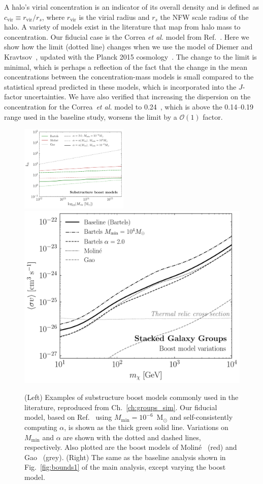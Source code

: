 A halo's virial concentration is an indicator of its overall density and is defined as $c_\text{vir} \equiv r_\text{vir}/r_s$, where $r_\text{vir}$ is the virial radius and $r_s$ the NFW scale radius of the halo.  A variety of models exist in the literature that map from halo mass to concentration.  Our fiducial case is the Correa \emph{et al.} model from Ref.~\cite{Correa:2015dva}.  Here we show how the limit (dotted line) changes when we use the model of Diemer and Kravtsov~\cite{Diemer:2014gba}, updated with the Planck 2015 cosmology~\cite{Ade:2015xua}.  The change to the limit is minimal, which is perhaps a reflection of the fact that the change in the mean concentrations between the concentration-mass models is small compared to the statistical spread predicted in these models, which is incorporated into the $J$-factor uncertainties.  We have also verified that increasing the dispersion on the concentration for the Correa~\emph{et al.} model to 0.24~\cite{Bullock:1999he}, which is above the 0.14--0.19 range used in the baseline study, worsens the limit by a $\mathcal{O}(1)$ factor.\vspace{0.1in}

\begin{figure}[t]
  \centering
  \includegraphics[width=0.46\textwidth]{ch-clusters/plots/boost_models_data.pdf} 
     \includegraphics[width=.45\textwidth]{ch-clusters/plots/systematics_boost.pdf}
  \caption{(Left) Examples of substructure boost models commonly used in the literature, reproduced from Ch.~\ref{ch:groups_sim}. Our fiducial model, based on Ref.~\cite{Bartels:2015uba} using $M_\text{min} = 10^{-6}$~M$_\odot$ and self-consistently computing $\alpha$, is shown as the thick green solid line. Variations on $M_\text{min}$ and $\alpha$ are shown with the dotted and dashed lines, respectively. Also plotted are the boost models of Molin\'e~\cite{Moline:2016pbm} (red) and Gao~\cite{Gao:2011rf} (grey).  (Right) The same as the baseline analysis shown in Fig.~\ref{fig:bounds1} of the main analysis, except varying the boost model.
  }
  \label{fig:systematics_boost}
\end{figure}

